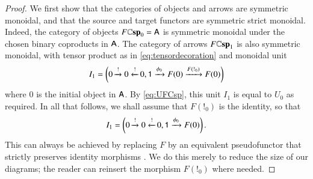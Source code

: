 \documentclass[reqno]{amsart}
\begin{document}
\begin{proof}
We first show that the categories of objects and arrows are symmetric monoidal, and that the source and target functors are symmetric strict monoidal.
Indeed, the category of objects $F\mathbf{\mathbb Csp}_0=\mathsf{A}$ is symmetric monoidal under the chosen binary coproducts in $\mathsf{A}$. The category of arrows $F\mathbf{\mathbb Csp}_1$ is also symmetric monoidal, with tensor product as in \cref{eq:tensordecoration} and monoidal unit
\[
I_1=\left(0\xrightarrow{!}0 \xleftarrow{!}0, \mathsf{1} \xrightarrow{\phi_0}F(0) \xrightarrow{F(!_0)} F(0) \right) 
\]
where $0$ is the initial object in $\mathsf{A}$.  By \cref{eq:UFCsp}, this unit $I_1$ is equal to $U_{0}$ as required.   In all that follows, we shall assume that $F(!_0)$ is the identity, so that
\begin{equation}\label{eq:monoidalunitFCsp}
I_1=\left(0\xrightarrow{!}0 \xleftarrow{!}0, \mathsf{1} \xrightarrow{\phi_0}F(0)\right).
\end{equation}
This can always be achieved by replacing $F$ by an equivalent pseudofunctor that strictly preserves identity morphisms \cite[Proposition 5.2]{LP}.  We do this merely to reduce the size of  our diagrams; the reader can reinsert the morphism $F(!_0)$ where needed. 


\end{proof}
\end{document}
